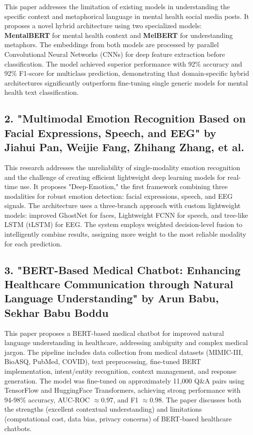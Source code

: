 \documentclass[11pt]{report}
\begin{document}
This paper addresses the limitation of existing models in understanding the specific context and metaphorical language in mental health social media posts. It proposes a novel hybrid architecture using two specialized models: \textbf{MentalBERT} for mental health context and \textbf{MelBERT} for understanding metaphors. The embeddings from both models are processed by parallel Convolutional Neural Networks (CNNs) for deep feature extraction before classification. The model achieved superior performance with 92\% accuracy and 92\% F1-score for multiclass prediction, demonstrating that domain-specific hybrid architectures significantly outperform fine-tuning single generic models for mental health text classification.

\subsection{2. "Multimodal Emotion Recognition Based on Facial Expressions, Speech, and EEG" by Jiahui Pan, Weijie Fang, Zhihang Zhang, et al. \cite{2}}

This research addresses the unreliability of single-modality emotion recognition and the challenge of creating efficient lightweight deep learning models for real-time use. It proposes "Deep-Emotion," the first framework combining three modalities for robust emotion detection: facial expressions, speech, and EEG signals. The architecture uses a three-branch approach with custom lightweight models: improved GhostNet for faces, Lightweight FCNN for speech, and tree-like LSTM (tLSTM) for EEG. The system employs weighted decision-level fusion to intelligently combine results, assigning more weight to the most reliable modality for each prediction.

\subsection{3. "BERT-Based Medical Chatbot: Enhancing Healthcare Communication through Natural Language Understanding" by Arun Babu, Sekhar Babu Boddu \cite{3}}

This paper proposes a BERT-based medical chatbot for improved natural language understanding in healthcare, addressing ambiguity and complex medical jargon. The pipeline includes data collection from medical datasets (MIMIC-III, BioASQ, PubMed, COVID), text preprocessing, fine-tuned BERT implementation, intent/entity recognition, context management, and response generation. The model was fine-tuned on approximately 11,000 Q\&A pairs using TensorFlow and HuggingFace Transformers, achieving strong performance with 94-98\% accuracy, AUC-ROC $\approx 0.97$, and F1 $\approx 0.98$. The paper discusses both the strengths (excellent contextual understanding) and limitations (computational cost, data bias, privacy concerns) of BERT-based healthcare chatbots.
\end{document}
